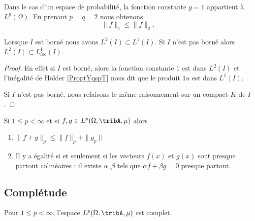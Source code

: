 \begin{remark}      \label{RemNormuptNird}
    Dans le cas d'un espace de probabilité, la fonction constante \( g=1\) appartient à \( L^p(\Omega)\). En prenant \( p=q=2\) nous obtenons
    \begin{equation}
        \| f \|_1\leq\| f \|_2.
    \end{equation}
\end{remark}

\begin{lemma}   \label{LemTLHwYzD}
    Lorsque \( I\) est borné nous avons \( L^2(I)\subset L^1(I)\). Si \( I\) n'est pas borné alors \( L^2(I)\subset L^1_{loc}(I)\).
\end{lemma}

\begin{proof}
    En effet si \( I\) est borné, alors la fonction constante \( 1\) est dans \( L^2(I)\) et l'inégalité de Hölder \ref{ProptYqspT} nous dit que le produit \( 1u\) est dans \( L^1(I)\).

    Si \( I\) n'est pas borné, nous refaisons le même raisonnement sur un compact \( K\) de \( I\).
\end{proof}

\begin{proposition}     \label{PropInegMinkKUpRHg}
    Si \( 1\leq p<\infty\) et si \( f,g\in L^p(\Omega,\tribA,\mu)\) alors
    \begin{enumerate}
        \item
            \( \| f+g \|_p\leq \| f \|_p+\| g_p \|\)
        \item
            Il y a égalité si et seulement si les vecteurs \( f(x)\) et \( g(x)\) sont presque partout colinéaires : il existe \( \alpha,\beta\) tels que \( \alpha f+\beta g=0\) presque partout.
    \end{enumerate}
\end{proposition}

\subsection{Complétude}

\begin{theorem}  \label{ThoUYBDWQX}
    Pour \( 1\leq p<\infty\), l'espace \( L^p(\Omega,\tribA,\mu)\) est complet.
\end{theorem}

